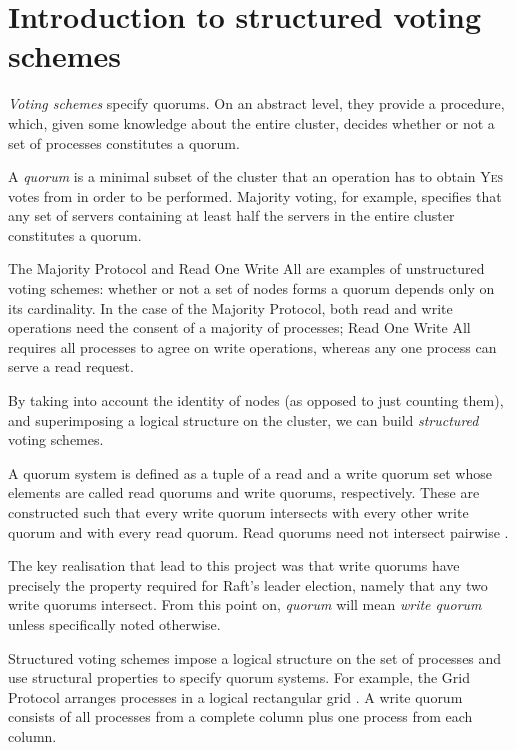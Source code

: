\documentclass[12pt,chapterprefix=true,toc=bibliography,numbers=noendperiod,
               footnotes=multiple,twoside]{scrreprt}
\newcommand{\yes}{{\fontfamily{jkposn}\selectfont\textsc{Yes}}}
\begin{document}
\section{Introduction to structured voting schemes}
\label{ssc:structured-voting-schemes}

\emph{Voting schemes} specify quorums. On an abstract level, they provide a procedure, which, given some knowledge about the entire cluster, decides whether or not a set of processes constitutes a quorum.

A \emph{quorum} is a minimal subset of the cluster that an operation has to obtain \yes{} votes from in order to be performed. Majority voting, for example, specifies that any set of servers containing at least half the servers in the entire cluster constitutes a quorum.

The Majority Protocol and Read One Write All are examples of unstructured voting schemes: whether or not a set of nodes forms a quorum depends only on its cardinality. In the case of the Majority Protocol, both read and write operations need the consent of a majority of processes; Read One Write All requires all processes to agree on write operations, whereas any one process can serve a read request.

By taking into account the identity of nodes (as opposed to just counting them), and superimposing a logical structure on the cluster, we can build \emph{structured} voting schemes.


A quorum system is defined as a tuple of a read and a write quorum set whose elements are called read quorums and write quorums, respectively. These are constructed such that every write quorum intersects with every other write quorum and with every read quorum. Read quorums need not intersect pairwise \autocite[For a formal definition of \emph{quorum}, \emph{quorum set} and \emph{quorum system}, see][section 2.3]{voting}.

The key realisation that lead to this project was that write quorums have precisely the property required for Raft's leader election, namely that any two write quorums intersect. From this point on, \emph{quorum} will mean \emph{write quorum} unless specifically noted otherwise.

\label{voting-example}

Structured voting schemes impose a logical structure on the set of processes and use structural properties to specify quorum systems. For example, the Grid Protocol arranges processes in a logical rectangular grid \autocite{grid}. A write quorum consists of all processes from a complete column plus one process from each column.
\end{document}
